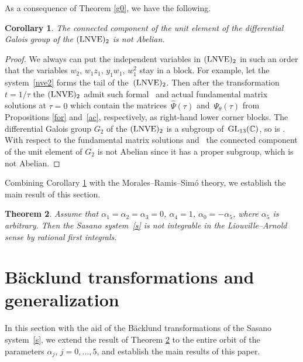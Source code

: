 \documentclass[10pt,a4paper]{amsart}
\numberwithin{equation}{section}
\newtheorem{Theorem}{Theorem}[section]
\newtheorem{Corollary}[Theorem]{Corollary}
\begin{document}
 As a consequence of Theorem \ref{g0}, we have the following.

 \begin{Corollary}\label{go}
 The connected component  of the unit element of the differential Galois group of the
 $({\rm LNVE})_2$ is not Abelian.
 \end{Corollary}

\begin{proof}
We always can put the independent variables in $({\rm LNVE})_2$ in such an order that the variables
 $w_2$, $w_1 z_1$, $y_1 w_1$, $w_1^2$ stay in a block. For example, let the system~\eqref{nve2} forms the tail of
 the~$({\rm LNVE})_2$. Then after the transformation $t=1/\tau$ the $({\rm LNVE})_2$ admit such
 formal~ and actual  fundamental matrix solutions
 at $\tau=0$ which contain the matrices~$\hat{\Psi}(\tau)$ and~$\Psi_{\theta}(\tau)$ from Propositions \ref{for} and~\ref{ac},
 respectively, as right-hand lower corner blocks.
 The differential Galois group $G_2$ of the $({\rm LNVE})_2$ is a subgroup of~${\rm GL}_{13}(\mathbb{C})$, so is .
 With respect to the fundamental matrix solutions
  and~ the connected component
 of the unit element  of $G_2$ is not Abelian since it has a proper
 subgroup, which is not Abelian.
\end{proof}

Combining Corollary \ref{go} with the Morales--Ramis--Sim\'{o} theory, we establish the main result of this section.

 \begin{Theorem}\label{main-s}
 Assume that $\alpha_1=\alpha_2=\alpha_3=0$, $\alpha_4=1$, $\alpha_0=-\alpha_5$, where $\alpha_5$ is arbitrary. Then the
 Sasano system~\eqref{s} is not integrable in the Liouville--Arnold sense by rational first integrals.
 \end{Theorem}

 \section{B\"{a}cklund transformations and generalization}\label{section4}

 In this section with the aid of the B\"{a}cklund transformations of the Sasano system~\eqref{s}, we extend the result of Theorem \ref{main-s}
 to the entire orbit of the parameters $\alpha_j$, $j=0, \dots, 5$, and establish the main results of this paper.
\end{document}
